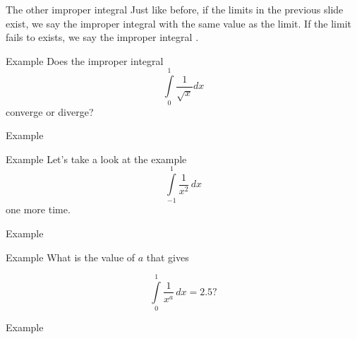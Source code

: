 \documentclass[presentation]{beamer}
\begin{document}
\begin{frame}[label={sec:org8da119b}]{The other improper integral}
Just like before, if the limits in the previous slide exist, we say
the improper integral \uline{\hspace*{1in}} with the same value as the
limit.  If the limit fails to exists, we say the improper integral
\uline{\hspace*{1in}}.
\end{frame}

\begin{frame}[label={sec:org2bfd86c}]{Example}
Does the improper integral
\[
\int\limits_0^1 \frac{1}{\sqrt{x}}dx
\]
converge or diverge?
\vspace{10in}
\end{frame}

\begin{frame}[label={sec:org8494bd2}]{Example}
\end{frame}

\begin{frame}[label={sec:org928cb35}]{Example}
Let's take a look at the example
\[
\int\limits_{-1}^1 \frac{1}{x^2}\,dx
\]
one more time.
\vspace{10in}
\end{frame}

\begin{frame}[label={sec:orgf347576}]{Example}
\end{frame}

\begin{frame}[label={sec:org31ffc86}]{Example}
What is the value of \(a\) that gives

\[
\int\limits_0^1 \frac{1}{x^a}\,dx = 2.5?\]
\vspace{10in}
\end{frame}

\begin{frame}[label={sec:org777bece}]{Example}
\end{frame}
\end{document}
